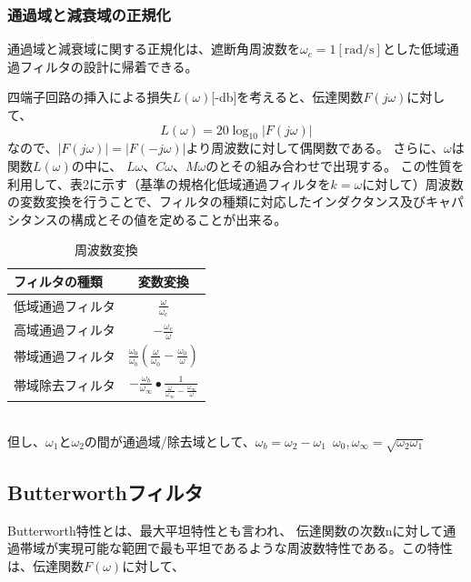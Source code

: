 \documentclass[10pt,a4j,dvipdfmx]{jsarticle}
\makeatletter
\let\@oldsubsec\subsection
\renewcommand{\subsection}[1]{\vspace{-7pt}\@oldsubsec{#1}}
\makeatother
\begin{document}
\subsubsection{通過域と減衰域の正規化}
通過域と減衰域に関する正規化は、遮断角周波数を$\omega_{c}=1[\si{\radian \per\second}]$とした低域通過フィルタの設計に帰着できる。

四端子回路の挿入による損失$L(\omega)$[-\si{\decibel}]を考えると、伝達関数$F(j\omega)$に対して、
\begin{equation}
L(\omega) = 20\log_{10}|F(j\omega)|
\end{equation}
なので、$|F(j\omega)| = |F(-j\omega)|$より周波数に対して偶関数である。
さらに、$\omega$は関数$L(\omega)$の中に、
$L\omega$、$C\omega$、$M\omega$のとその組み合わせで出現する。
この性質を利用して、表2に示す（基準の規格化低域通過フィルタを$k=\omega$に対して）周波数の変数変換を行うことで、フィルタの種類に対応したインダクタンス及びキャパシタンスの構成とその値を定めることが出来る。

\begin{table}[htb]
  \begin{center}
    \caption{周波数変換}
    \begin{tabular}{|l||c|} \hline
      フィルタの種類 & 変数変換 \\ \hline \hline
      低域通過フィルタ & $\frac{\omega}{\omega_{c}} $  \\
      高域通過フィルタ & $ -\frac{\omega_{c}}{\omega}$ \\
      帯域通過フィルタ & $\frac{\omega_{0}}{\omega_{b}}\left( \frac{\omega}{\omega_{0}} - \frac{\omega_{0}}{\omega} \right)$  \\
      帯域除去フィルタ & $-\frac{\omega_{b}}{\omega_{\infty}}\bullet\frac{1}{\frac{\omega}{\omega_{\infty}} - \frac{\omega_{\infty}}{\omega}}$  \\ \hline
    \end{tabular}
    \\ 但し、$\omega_{1}$と$\omega_{2}$の間が通過域/除去域として、$\omega_{b} = \omega_{2}-\omega_{1}\hspace{6pt}\omega_{0}, \omega_{\infty} = \sqrt{\omega_{2}\omega_{1}}$
  \end{center}
\end{table}

\subsection{Butterworthフィルタ}
Butterworth特性とは、最大平坦特性とも言われ、
伝達関数の次数nに対して通過帯域が実現可能な範囲で最も平坦であるような周波数特性である。この特性は、伝達関数$F(\omega)$に対して、
\end{document}
